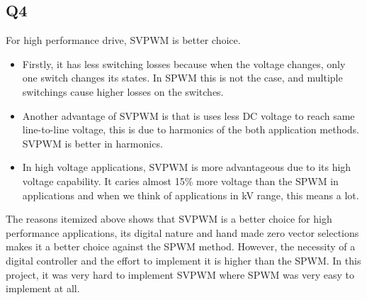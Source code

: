\subsection{Q4}

For high performance drive, SVPWM is better choice. 
\begin{itemize}
    \item Firstly, it has less switching losses because when the voltage changes, only one switch changes its states. In SPWM this is not the case, and multiple switchings cause higher losses on the switches.
    \item Another advantage of SVPWM is that is uses less DC voltage to reach same line-to-line voltage, this is due to harmonics of the both application methods. SVPWM is better in harmonics.
    \item In high voltage applications, SVPWM is more advantageous due to its high voltage capability. It caries almost 15\% more voltage than the SPWM in applications and when we think of applications in kV range, this means a lot.
\end{itemize}

The reasons itemized above shows that SVPWM is a better choice for high performance applications, its digital nature and hand made zero vector selections makes it a better choice against the SPWM method. However, the necessity of a digital controller and the effort to implement it is higher than the SPWM. In this project, it was very hard to implement SVPWM where SPWM was very easy to implement at all.
